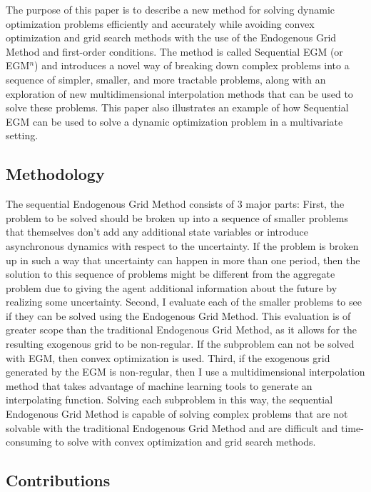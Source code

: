 \documentclass{article}
\begin{document}
The purpose of this paper is to describe a new method for solving dynamic optimization problems efficiently and accurately while avoiding convex optimization and grid search methods with the use of the Endogenous Grid Method and first-order conditions. The method is called Sequential EGM (or EGM$^n$) and introduces a novel way of breaking down complex problems into a sequence of simpler, smaller, and more tractable problems, along with an exploration of new multidimensional interpolation methods that can be used to solve these problems. This paper also illustrates an example of how Sequential EGM can be used to solve a dynamic optimization problem in a multivariate setting.

\subsection{Methodology}\label{Methodology}


The sequential Endogenous Grid Method consists of 3 major parts: First, the problem to be solved should be broken up into a sequence of smaller problems that themselves don't add any additional state variables or introduce asynchronous dynamics with respect to the uncertainty. If the problem is broken up in such a way that uncertainty can happen in more than one period, then the solution to this sequence of problems might be different from the aggregate problem due to giving the agent additional information about the future by realizing some uncertainty. Second, I evaluate each of the smaller problems to see if they can be solved using the Endogenous Grid Method. This evaluation is of greater scope than the traditional Endogenous Grid Method, as it allows for the resulting exogenous grid to be non-regular. If the subproblem can not be solved with EGM, then convex optimization is used. Third, if the exogenous grid generated by the EGM is non-regular, then I use a multidimensional interpolation method that takes advantage of machine learning tools to generate an interpolating function. Solving each subproblem in this way, the sequential Endogenous Grid Method is capable of solving complex problems that are not solvable with the traditional Endogenous Grid Method and are difficult and time-consuming to solve with convex optimization and grid search methods.

\subsection{Contributions}\label{Contributions}
\end{document}
